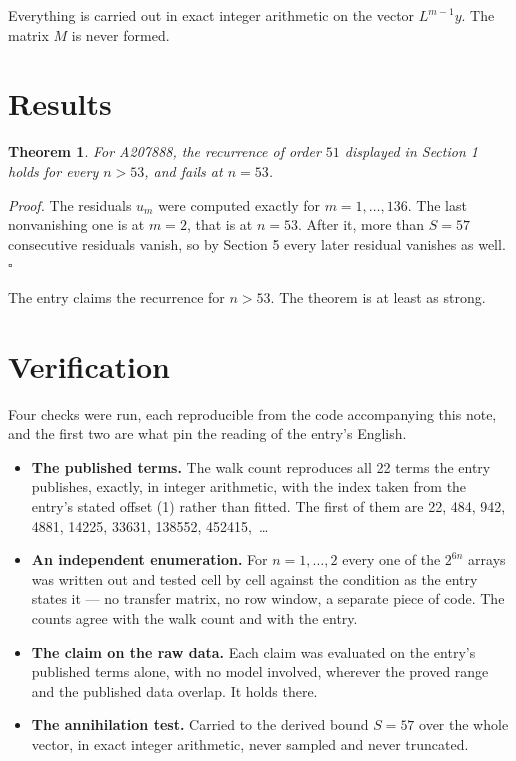 \documentclass[11pt]{article}
\newtheorem{theorem}{Theorem}
\theoremstyle{definition}
\begin{document}
Everything is carried out in exact integer arithmetic on the vector $L^{m-1}y$. The matrix $M$ is never formed.

\section{Results}

\begin{theorem} For A207888, the recurrence of order $51$ displayed in Section 1 holds for every $n > 53$, and fails at $n = 53$.\end{theorem}

{\itshape Proof.} The residuals $u_m$ were computed exactly for $m = 1,\dots,136$. The last nonvanishing one is at $m = 2$, that is at $n = 53$. After it, more than $S = 57$ consecutive residuals vanish, so by Section 5 every later residual vanishes as well. $\square$

The entry claims the recurrence for $n > 53$. The theorem is at least as strong.

\section{Verification}

Four checks were run, each reproducible from the code accompanying this note, and the first two are what pin the reading of the entry's English.

\begin{itemize}

\item {\bfseries The published terms.} The walk count reproduces all 22 terms the entry publishes, exactly, in integer arithmetic, with the index taken from the entry's stated offset (1) rather than fitted. The first of them are 22, 484, 942, 4881, 14225, 33631, 138552, 452415,~\dots

\item {\bfseries An independent enumeration.} For $n = 1,\dots,2$ every one of the $2^{6n}$ arrays was written out and tested cell by cell against the condition as the entry states it --- no transfer matrix, no row window, a separate piece of code. The counts agree with the walk count and with the entry.

\item {\bfseries The claim on the raw data.} Each claim was evaluated on the entry's published terms alone, with no model involved, wherever the proved range and the published data overlap. It holds there.

\item {\bfseries The annihilation test.} Carried to the derived bound $S = 57$ over the whole vector, in exact integer arithmetic, never sampled and never truncated.

\end{itemize}
\end{document}
